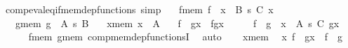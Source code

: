 \begin{isabellebody}
%
\endisatagproof
{\isafoldproof}%
%
\isadelimproof
\isanewline
%
\endisadelimproof
\isanewline
{}\isamarkupfalse%
\ comp{\isacharunderscore}{\kern0pt}eval{\isacharunderscore}{\kern0pt}eq{\isacharunderscore}{\kern0pt}if{\isacharunderscore}{\kern0pt}mem{\isacharunderscore}{\kern0pt}dep{\isacharunderscore}{\kern0pt}functions\ {\isacharbrackleft}{\kern0pt}simp{\isacharbrackright}{\kern0pt}{\isacharcolon}{\kern0pt}\isanewline
\ \ \ f{\isacharunderscore}{\kern0pt}mem{\isacharcolon}{\kern0pt}\ {\isachardoublequoteopen}f\ {\isasymin}\ {\isacharparenleft}{\kern0pt}x\ {\isasymin}\ B{\isacharparenright}{\kern0pt}\ {\isasymrightarrow}s\ {\isacharparenleft}{\kern0pt}C\ x{\isacharparenright}{\kern0pt}{\isachardoublequoteclose}\isanewline
\ \ \ g{\isacharunderscore}{\kern0pt}mem{\isacharcolon}{\kern0pt}\ {\isachardoublequoteopen}g\ {\isasymin}\ A\ {\isasymrightarrow}s\ B{\isachardoublequoteclose}\isanewline
\ \ \ x{\isacharunderscore}{\kern0pt}mem{\isacharcolon}{\kern0pt}\ {\isachardoublequoteopen}x\ {\isasymin}\ A{\isachardoublequoteclose}\isanewline
\ \ \ {\isachardoublequoteopen}{\isacharparenleft}{\kern0pt}f\ {\isasymcirc}\ g{\isacharparenright}{\kern0pt}{\isacharbackquote}{\kern0pt}x\ {\isacharequal}{\kern0pt}\ f{\isacharbackquote}{\kern0pt}{\isacharparenleft}{\kern0pt}g{\isacharbackquote}{\kern0pt}x{\isacharparenright}{\kern0pt}{\isachardoublequoteclose}\isanewline
%
\isadelimproof
%
\endisadelimproof
%
\isatagproof
{}\isamarkupfalse%
\ {\isacharminus}{\kern0pt}\isanewline
\ \ \isamarkupfalse%
\ {\isachardoublequoteopen}f\ {\isasymcirc}\ g\ {\isasymin}\ {\isacharparenleft}{\kern0pt}x\ {\isasymin}\ A{\isacharparenright}{\kern0pt}\ {\isasymrightarrow}s\ {\isacharparenleft}{\kern0pt}C\ {\isacharparenleft}{\kern0pt}g{\isacharbackquote}{\kern0pt}x{\isacharparenright}{\kern0pt}{\isacharparenright}{\kern0pt}{\isachardoublequoteclose}\isanewline
\ \ \ \ \isamarkupfalse%
\ f{\isacharunderscore}{\kern0pt}mem\ g{\isacharunderscore}{\kern0pt}mem\ comp{\isacharunderscore}{\kern0pt}mem{\isacharunderscore}{\kern0pt}dep{\isacharunderscore}{\kern0pt}functionsI\ \isamarkupfalse%
\ auto\isanewline
\ \ \isamarkupfalse%
\ x{\isacharunderscore}{\kern0pt}mem\ \isamarkupfalse%
\ {\isachardoublequoteopen}{\isasymlangle}x{\isacharcomma}{\kern0pt}\ {\isacharparenleft}{\kern0pt}f\ {\isasymcirc}\ g{\isacharparenright}{\kern0pt}{\isacharbackquote}{\kern0pt}x{\isasymrangle}\ {\isasymin}\ f\ {\isasymcirc}\ g{\isachardoublequoteclose}\isanewline

\end{isabellebody}
